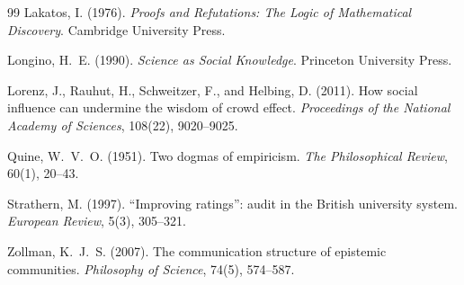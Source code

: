 \documentclass[11pt]{article}
\theoremstyle{remark}
\begin{document}
\begin{thebibliography}{99}
Lakatos, I. (1976). \emph{Proofs and Refutations: The Logic of Mathematical Discovery}. Cambridge University Press.

Longino, H.~E. (1990). \emph{Science as Social Knowledge}. Princeton University Press.

Lorenz, J., Rauhut, H., Schweitzer, F., and Helbing, D. (2011). How social influence can undermine the wisdom of crowd effect. \emph{Proceedings of the National Academy of Sciences}, 108(22), 9020--9025.

Quine, W.~V.~O. (1951). Two dogmas of empiricism. \emph{The Philosophical Review}, 60(1), 20--43.

Strathern, M. (1997). ``Improving ratings'': audit in the British university system. \emph{European Review}, 5(3), 305--321.

Zollman, K.~J.~S. (2007). The communication structure of epistemic communities. \emph{Philosophy of Science}, 74(5), 574--587.

\end{thebibliography}
\end{document}
